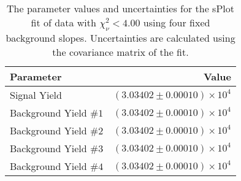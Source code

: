 
\begin{table}[ht]
    \begin{center}
        \begin{tabular}{lr}\toprule
            Parameter & Value \\\midrule
            Signal Yield & $(3.03402 \pm 0.00010) \times 10^{4}$ \\
            Background Yield $\#1$ & $(3.03402 \pm 0.00010) \times 10^{4}$ \\
            Background Yield $\#2$ & $(3.03402 \pm 0.00010) \times 10^{4}$ \\
            Background Yield $\#3$ & $(3.03402 \pm 0.00010) \times 10^{4}$ \\
            Background Yield $\#4$ & $(3.03402 \pm 0.00010) \times 10^{4}$ \\\bottomrule
        \end{tabular}
        \caption{The parameter values and uncertainties for the sPlot fit of data with $\chi^2_\nu < 4.00$ using four fixed background slopes. Uncertainties are calculated using the covariance matrix of the fit.}\label{tab:splot-fit-results-chisqdof-4.00-fixed-4}
    \end{center}
\end{table}
